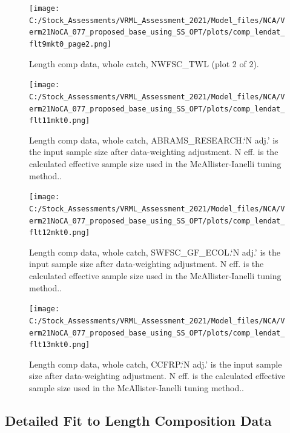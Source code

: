 \documentclass[11pt,
  english,
  a4paper,
]{article}
\begin{document}
\begin{figure}
\centering
\texttt{[image: C:/Stock\_Assessments/VRML\_Assessment\_2021/Model\_files/NCA/Verm21NoCA\_077\_proposed\_base\_using\_SS\_OPT/plots/comp\_lendat\_flt9mkt0\_page2.png]}
\caption{Length comp data, whole catch, NWFSC\_TWL (plot 2 of 2).\label{fig:comp_lendat_flt9mkt0_page2}}
\end{figure}

\begin{figure}
\centering
\texttt{[image: C:/Stock\_Assessments/VRML\_Assessment\_2021/Model\_files/NCA/Verm21NoCA\_077\_proposed\_base\_using\_SS\_OPT/plots/comp\_lendat\_flt11mkt0.png]}
\caption{Length comp data, whole catch, ABRAMS\_RESEARCH.`N adj.' is the input sample size after data-weighting adjustment. N eff. is the calculated effective sample size used in the McAllister-Ianelli tuning method..\label{fig:comp_lendat_flt11mkt0}}
\end{figure}

\begin{figure}
\centering
\texttt{[image: C:/Stock\_Assessments/VRML\_Assessment\_2021/Model\_files/NCA/Verm21NoCA\_077\_proposed\_base\_using\_SS\_OPT/plots/comp\_lendat\_flt12mkt0.png]}
\caption{Length comp data, whole catch, SWFSC\_GF\_ECOL.`N adj.' is the input sample size after data-weighting adjustment. N eff. is the calculated effective sample size used in the McAllister-Ianelli tuning method..\label{fig:comp_lendat_flt12mkt0}}
\end{figure}

\begin{figure}
\centering
\texttt{[image: C:/Stock\_Assessments/VRML\_Assessment\_2021/Model\_files/NCA/Verm21NoCA\_077\_proposed\_base\_using\_SS\_OPT/plots/comp\_lendat\_flt13mkt0.png]}
\caption{Length comp data, whole catch, CCFRP.`N adj.' is the input sample size after data-weighting adjustment. N eff. is the calculated effective sample size used in the McAllister-Ianelli tuning method..\label{fig:comp_lendat_flt13mkt0}}
\end{figure}

\newpage


\hypertarget{append-fit}{%
\subsection{Detailed Fit to Length Composition Data}\label{append-fit}}

\leavevmode\tagmcend\tagstructend
\end{document}
